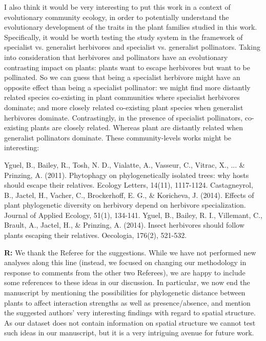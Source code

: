 \documentclass[12pt]{letter}
\newenvironment{refquote}{\bigskip \begin{it}}{\end{it}\smallskip}
\begin{document}
    \begin{refquote}

      I also think it would be very interesting to put this work in a context of evolutionary community ecology, in order to potentially understand the evolutionary development of the traits in the plant families studied in this work. Specifically, it would be worth testing the study system in the framework of specialist vs. generalist herbivores and specialist vs. generalist pollinators. Taking into consideration that herbivores and pollinators have an evolutionary contrasting impact on plants: plants want to escape herbivores but want to be pollinated. So we can guess that being a specialist herbivore might have an opposite effect than being a specialist pollinator: we might find more distantly related species co-existing in plant communities where specialist herbivores dominate; and more closely related co-existing plant species when generalist herbivores dominate. Contrastingly, in the presence of specialist pollinators, co-existing plants are closely related. Whereas plant are distantly related when generalist pollinators dominate. These community-levels works might be interesting:

      \smallskip
      
      Yguel, B., Bailey, R., Tosh, N. D., Vialatte, A., Vasseur, C., Vitrac, X., ... \& Prinzing, A. (2011). Phytophagy on phylogenetically isolated trees: why hosts should escape their relatives. Ecology Letters, 14(11), 1117-1124.
      \smallskip
      Castagneyrol, B., Jactel, H., Vacher, C., Brockerhoff, E. G., \& Koricheva, J. (2014). Effects of plant phylogenetic diversity on  herbivory depend on herbivore specialization. Journal of Applied Ecology, 51(1), 134-141.
      \smallskip
      Yguel, B., Bailey, R. I., Villemant, C., Brault, A., Jactel, H., \& Prinzing, A. (2014). Insect herbivores should follow plants escaping their relatives. Oecologia, 176(2), 521-532.

      \end{refquote}


      \textbf{R:} We thank the Referee for the suggestions. While we have not performed new analyses along this line (instead, we focused on changing our methodology in response to comments from the other two Referees), we are happy to include some references to these ideas in our discussion. In particular, we now end the manuscript by mentioning the possibilities for phylogenetic distance between plants to affect interaction strengths as well as presence/absence, and mention the suggested authors' very interesting findings with regard to spatial structure. As our dataset does not contain information on spatial structure we cannot test such ideas in our manuscript, but it is a very intriguing avenue for future work.
\end{document}
